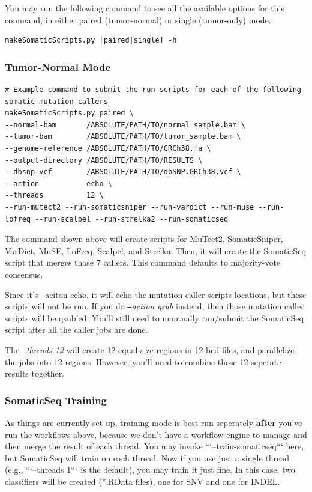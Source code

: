 \documentclass[10pt,letterpaper]{article}
\begin{document}
\begin{sloppypar}
You may run the following command to see all the available options for this command, in either paired (tumor-normal) or single (tumor-only) mode.

\begin{lstlisting}
makeSomaticScripts.py [paired|single] -h
\end{lstlisting} 

\subsubsection{Tumor-Normal Mode}

\begin{lstlisting}
# Example command to submit the run scripts for each of the following somatic mutation callers
makeSomaticScripts.py paired \
--normal-bam       /ABSOLUTE/PATH/TO/normal_sample.bam \
--tumor-bam        /ABSOLUTE/PATH/TO/tumor_sample.bam \
--genome-reference /ABSOLUTE/PATH/TO/GRCh38.fa \
--output-directory /ABSOLUTE/PATH/TO/RESULTS \
--dbsnp-vcf        /ABSOLUTE/PATH/TO/dbSNP.GRCh38.vcf \
--action           echo \
--threads          12 \
--run-mutect2 --run-somaticsniper --run-vardict --run-muse --run-lofreq --run-scalpel --run-strelka2 --run-somaticseq
\end{lstlisting}

The command shown above will create scripts for MuTect2, SomaticSniper, VarDict, MuSE, LoFreq, Scalpel, and Strelka. Then, it will create the SomaticSeq script that merges those 7 callers. This command defaults to majority-vote consensus.

Since it's \texttt{--}aciton echo, it will echo the mutation caller scripts locations, but these scripts will not be run. If you do \textit{\texttt{--}action qsub} instead, then those mutation caller scripts will be qsub'ed. You'll still need to mantually run/submit the SomaticSeq script after all the caller jobs are done.

The \textit{\texttt{--}threads 12} will create 12 equal-size regions in 12 bed files, and parallelize the jobs into 12 regions. However, you'll need to combine those 12 seperate results together. 




\subsubsection{SomaticSeq Training}

As things are currently set up, training mode is best run seperately \textbf{after} you've run the workflows above, because we don't have a workflow engine to manage and then merge the result of each thread. You may invoke ```--train-somaticseq``` here, but SomaticSeq will train on each thread. Now if you use just a single thread (e.g., ```--threads 1``` is the default), you may train it just fine. In this case, two classifiers will be created (*.RData files), one for SNV and one for INDEL.


\end{sloppypar}
\end{document}
